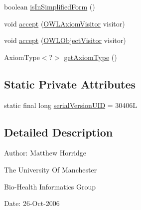 \begin{DoxyCompactItemize}
\item 
boolean \hyperlink{classuk_1_1ac_1_1manchester_1_1cs_1_1owl_1_1owlapi_1_1_o_w_l_object_property_assertion_axiom_impl_a225391e3d4baf0e9c7fb5daeb756e115}{is\-In\-Simplified\-Form} ()
\item 
void \hyperlink{classuk_1_1ac_1_1manchester_1_1cs_1_1owl_1_1owlapi_1_1_o_w_l_object_property_assertion_axiom_impl_ad5996f5350abfa4ae796ff1da0af3e2d}{accept} (\hyperlink{interfaceorg_1_1semanticweb_1_1owlapi_1_1model_1_1_o_w_l_axiom_visitor}{O\-W\-L\-Axiom\-Visitor} visitor)
\item 
void \hyperlink{classuk_1_1ac_1_1manchester_1_1cs_1_1owl_1_1owlapi_1_1_o_w_l_object_property_assertion_axiom_impl_a86efc1cf3bbc2b849d0801ffb4fc962e}{accept} (\hyperlink{interfaceorg_1_1semanticweb_1_1owlapi_1_1model_1_1_o_w_l_object_visitor}{O\-W\-L\-Object\-Visitor} visitor)
\item 
Axiom\-Type$<$?$>$ \hyperlink{classuk_1_1ac_1_1manchester_1_1cs_1_1owl_1_1owlapi_1_1_o_w_l_object_property_assertion_axiom_impl_ad008c2a6661fdfd39be7623053ab9fbc}{get\-Axiom\-Type} ()
\end{DoxyCompactItemize}
\subsection*{Static Private Attributes}
\begin{DoxyCompactItemize}
\item 
static final long \hyperlink{classuk_1_1ac_1_1manchester_1_1cs_1_1owl_1_1owlapi_1_1_o_w_l_object_property_assertion_axiom_impl_a2717746fc18979ac7c4e1b263c5a64f4}{serial\-Version\-U\-I\-D} = 30406\-L
\end{DoxyCompactItemize}


\subsection{Detailed Description}
Author\-: Matthew Horridge\par
 The University Of Manchester\par
 Bio-\/\-Health Informatics Group\par
 Date\-: 26-\/\-Oct-\/2006\par
\par
 

